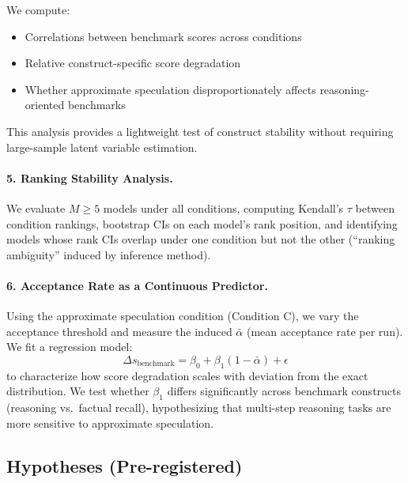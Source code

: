 \documentclass{article}
\begin{document}
We compute:
\begin{itemize}[leftmargin=1.5em]
    \item Correlations between benchmark scores across conditions
    \item Relative construct-specific score degradation
    \item Whether approximate speculation disproportionately affects reasoning-oriented benchmarks
\end{itemize}

This analysis provides a lightweight test of construct stability without requiring large-sample latent variable estimation.

\paragraph{5. Ranking Stability Analysis.}
We evaluate $M \geq 5$ models under all conditions, computing Kendall's $\tau$ between condition rankings, bootstrap CIs on each model's rank position, and identifying models whose rank CIs overlap under one condition but not the other (``ranking ambiguity'' induced by inference method).

\paragraph{6. Acceptance Rate as a Continuous Predictor.}
Using the approximate speculation condition (Condition C), we vary the acceptance threshold and measure the induced $\bar{\alpha}$ (mean acceptance rate per run). We fit a regression model:
\begin{equation}
\Delta s_{\text{benchmark}} = \beta_0 + \beta_1 (1 - \bar{\alpha}) + \epsilon
\end{equation}
to characterize how score degradation scales with deviation from the exact distribution. We test whether $\beta_1$ differs significantly across benchmark constructs (reasoning vs.\ factual recall), hypothesizing that multi-step reasoning tasks are more sensitive to approximate speculation.

\subsection{Hypotheses (Pre-registered)}
\end{document}
